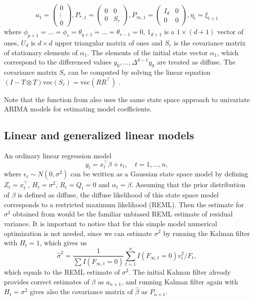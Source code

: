 \documentclass[nojss,article]{jss}\usepackage[]{graphicx}\usepackage[]{color}
\begin{document}
\begin{displaymath}
a_1 =
\left( \begin{array}{c}
0 \\
\vdots \\
0
\end{array}\right),
P_{*,1} =
\left( \begin{array}{cccccc}
0 & 0 \\
0 & S_r
\end{array} \right),
P_{\infty,1} =
\left( \begin{array}{cccccc}
I_{d} & 0 \\
0 & 0
\end{array} \right),
\eta_t=\xi_{t+1}
\end{displaymath}
where $\phi_{p+1}=\ldots=\phi_r=\theta_{q+1}=\ldots=\theta_{r-1}=0$, $1_{d+1}$ is a $1\times (d+1)$ vector of ones, $U_d$ is $d \times d$ upper triangular matrix of ones and $S_r$ is the covariance matrix of stationary elements of $\alpha_1$. The elements of the initial state vector $\alpha_1$, which correspond to the differenced values $y_0, \ldots, \Delta^{d-1}y_0$ are treated as diffuse. The covariance matrix $S_r$ can be computed by solving the linear equation $(I-T \otimes T)\textrm{vec}(S_r) = \textrm{vec}(RR^\top)$ \citep[p.138]{DK2012}.

Note that the  function from  also uses the same state space approach to univariate ARIMA models for estimating model coefficients.


\subsection{Linear and generalized linear models}

An ordinary linear regression model 
\begin{equation*}
y_t = x^\top_t \beta + \epsilon_t, \quad t=1,\ldots,n,
\end{equation*}
where $\epsilon_t \sim N(0,\sigma^2)$ can be written as a Gaussian state space model by defining $Z_t=x^\top_t$, $H_t=\sigma^2$, $R_t=Q_t=0$ and $\alpha_t=\beta$. Assuming that the prior distribution of $\beta$ is defined as diffuse, the diffuse likelihood of this state space model corresponds to a restricted maximum likelihood (REML). Then the estimate for $\sigma^2$ obtained from  would be the familiar unbiased REML estimate of residual variance. It is important to notice that for this simple model numerical optimization is not needed, since we can estimate $\sigma^2$ by running the Kalman filter with $H_t=1$, which gives us 
\begin{equation*}
\hat \sigma^2 = \frac{1}{\sum I(F_{\infty,t} = 0)} \sum_{t=1}^n I(F_{\infty,t} = 0) v_t^2/F_t,
\end{equation*}
which equals to the REML estimate of $\sigma^2$. The initial Kalman filter already provides correct estimates of $\beta$ as $a_{n+1}$, and running Kalman filter again with $H_t=\sigma^2$ gives also the covariance matrix of $\hat \beta$ as $P_{n+1}$. 
\end{document}
